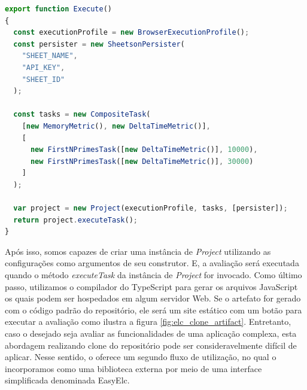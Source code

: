 \documentclass[12pt]{tcc}
\begin{document}
\begin{minipage}{\linewidth}
\begin{lstlisting}[label={lst:elc_index_ts_example}, caption={Exemplo de script principal avaliando uma comparação de tempo de execução entre duas execuções de uma tarefa FirstNPrimesTask. Onde a avaliação é executada em navegadores e as métricas coletadas são armazenadas em uma planilha online.}, language=TypeScript, breaklines=true]
export function Execute()
{
  const executionProfile = new BrowserExecutionProfile();
  const persister = new SheetsonPersister(
    "SHEET_NAME",
    "API_KEY",
    "SHEET_ID"
  );

  const tasks = new CompositeTask(
    [new MemoryMetric(), new DeltaTimeMetric()],
    [
      new FirstNPrimesTask([new DeltaTimeMetric()], 10000),
      new FirstNPrimesTask([new DeltaTimeMetric()], 30000)
    ]
  );

  var project = new Project(executionProfile, tasks, [persister]);
  return project.executeTask();
}
\end{lstlisting}
\end{minipage}

	Após isso, somos capazes de criar uma instância de \emph{Project} utilizando as configurações como argumentos de seu construtor.
	E, a avaliação será executada quando o método \emph{executeTask} da instância de \emph{Project} for invocado.
	Como último passo, utilizamos o compilador do TypeScript para gerar os arquivos JavaScript os quais podem ser hospedados em algum servidor Web.
	Se o artefato for gerado com o código padrão do repositório, ele será um site estático com um botão para executar a avaliação como ilustra a figura \ref{fig:elc_clone_artifact}.
	Entretanto, caso o desejado seja avaliar as funcionalidades de uma aplicação complexa, esta abordagem realizando clone do repositório pode ser consideravelmente difícil de aplicar.
	Nesse sentido, o  oferece um segundo fluxo de utilização, no qual o incorporamos como uma biblioteca externa por meio de uma interface simplificada denominada EasyElc.
\end{document}
